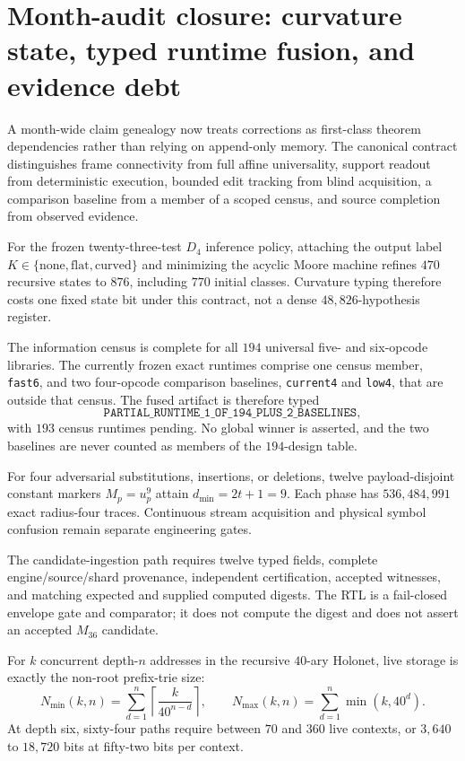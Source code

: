 \section{Month-audit closure: curvature state, typed runtime fusion, and evidence debt}
\label{sec:pass3193-month-audit}

A month-wide claim genealogy now treats corrections as first-class theorem dependencies rather than relying on append-only memory. The canonical contract distinguishes frame connectivity from full affine universality, support readout from deterministic execution, bounded edit tracking from blind acquisition, a comparison baseline from a member of a scoped census, and source completion from observed evidence.

For the frozen twenty-three-test $D_4$ inference policy, attaching the output label $K\in\{\mathrm{none},\mathrm{flat},\mathrm{curved}\}$ and minimizing the acyclic Moore machine refines $470$ recursive states to $876$, including $770$ initial classes. Curvature typing therefore costs one fixed state bit under this contract, not a dense $48{,}826$-hypothesis register.

The information census is complete for all $194$ universal five- and six-opcode libraries. The currently frozen exact runtimes comprise one census member, \texttt{fast6}, and two four-opcode comparison baselines, \texttt{current4} and \texttt{low4}, that are outside that census. The fused artifact is therefore typed
\[
\texttt{PARTIAL\_RUNTIME\_1\_OF\_194\_PLUS\_2\_BASELINES},
\]
with $193$ census runtimes pending. No global winner is asserted, and the two baselines are never counted as members of the $194$-design table.

For four adversarial substitutions, insertions, or deletions, twelve payload-disjoint constant markers $M_p=u_p^9$ attain $d_{\min}=2t+1=9$. Each phase has $536{,}484{,}991$ exact radius-four traces. Continuous stream acquisition and physical symbol confusion remain separate engineering gates.

The candidate-ingestion path requires twelve typed fields, complete engine/source/shard provenance, independent certification, accepted witnesses, and matching expected and supplied computed digests. The RTL is a fail-closed envelope gate and comparator; it does not compute the digest and does not assert an accepted $M_{36}$ candidate.

For $k$ concurrent depth-$n$ addresses in the recursive $40$-ary Holonet, live storage is exactly the non-root prefix-trie size:
\[
N_{\min}(k,n)=\sum_{d=1}^{n}\left\lceil\frac{k}{40^{n-d}}\right\rceil,
\qquad
N_{\max}(k,n)=\sum_{d=1}^{n}\min(k,40^d).
\]
At depth six, sixty-four paths require between $70$ and $360$ live contexts, or $3{,}640$ to $18{,}720$ bits at fifty-two bits per context.

